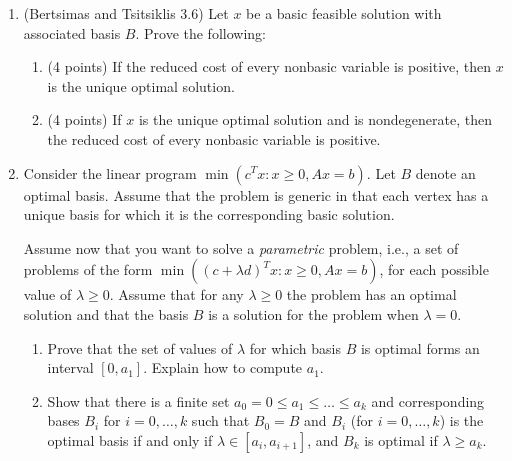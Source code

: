 \documentclass[11pt]{article}
\begin{document}

\begin{enumerate}
\item (Bertsimas and Tsitsiklis 3.6)  Let $x$ be a basic feasible solution with associated basis $B$.  Prove the following:
\begin{enumerate}
\item (4 points) If the reduced cost of every nonbasic variable is positive, then $x$ is the unique optimal solution.
\item (4 points) If $x$ is the unique optimal solution and is nondegenerate, then the reduced cost of every nonbasic variable is positive.
\end{enumerate}

\item Consider the linear program $\min (c^T x : x \ge 0, Ax=b)$.
Let $B$ denote an optimal basis. Assume that the problem is generic in
that each vertex has a unique basis for which it is the corresponding basic
solution. 

Assume now that you want to solve
a {\em parametric} problem, i.e., a set of problems of the form
$\min ((c +\lambda d)^T x : x \ge 0, Ax=b)$, for each possible value
of $\lambda \ge 0$. Assume that for any $\lambda \geq 0$ the problem has an optimal solution and that the basis $B$ is a solution for the problem when
$\lambda=0$.
\begin{enumerate}
\item Prove that the set of values of $\lambda$ for which basis $B$ is
optimal forms an interval $[0,a_1]$. Explain how to compute $a_1$.
\item  Show that there is a finite set $a_0=0 \le a_1 \le \ldots \le a_k$ and
corresponding bases $B_i$ for $i=0, \ldots, k$ such that $B_0=B$ and
$B_i$ (for $i=0,\ldots,k$) is the optimal basis if and only if
$\lambda \in [a_i,a_{i+1}]$, and $B_k$ is optimal if $\lambda \ge a_k$.
\end{enumerate}


\end{enumerate}
\end{document}
